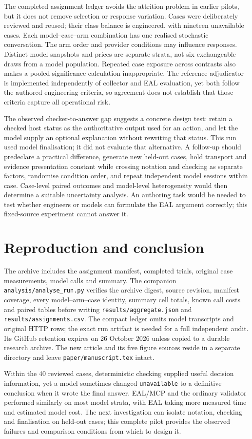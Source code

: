 \documentclass[11pt,a4paper]{article}
\newcommand{\code}[1]{\texttt{#1}}
\begin{document}
The completed assignment ledger avoids the attrition problem in earlier pilots, but it does not remove selection or response variation. Cases were deliberately reviewed and reused; their class balance is engineered, with nineteen unavailable cases. Each model--case--arm combination has one realised stochastic conversation. The arm order and provider conditions may influence responses. Distinct model snapshots and prices are separate strata, not six exchangeable draws from a model population. Repeated case exposure across contrasts also makes a pooled significance calculation inappropriate. The reference adjudicator is implemented independently of collector and EAL evaluation, yet both follow the authored engineering criteria, so agreement does not establish that those criteria capture all operational risk.

The observed checker-to-answer gap suggests a concrete design test: retain a checked host status as the authoritative output used for an action, and let the model supply an optional explanation without rewriting that status. This run used model finalisation; it did not evaluate that alternative. A follow-up should predeclare a practical difference, generate new held-out cases, hold transport and evidence presentation constant while crossing notation and checking as separate factors, randomise condition order, and repeat independent model sessions within case. Case-level paired outcomes and model-level heterogeneity would then determine a suitable uncertainty analysis. An authoring task would be needed to test whether engineers or models can formulate the EAL argument correctly; this fixed-source experiment cannot answer it.

\section{Reproduction and conclusion}
The archive includes the assignment manifest, completed trials, original case measurements, model calls and summary. The companion \code{analysis/analyse\_run.py} verifies the archive digest, source revision, manifest coverage, every model--arm--case identity, summary cell totals, known call costs and paired tables before writing \code{results/aggregate.json} and \code{results/assignments.csv}. The compact ledger omits model transcripts and original HTTP rows; the exact run artifact is needed for a full independent audit. Its GitHub retention expires on 26 October 2026 unless copied to a durable research archive. The new article and its five figure sources reside in a separate directory and leave \code{paper/manuscript.tex} intact.

Within the 40 reviewed cases, deterministic checking supplied useful decision information, yet a model sometimes changed \code{unavailable} to a definitive conclusion when it wrote the final answer. EAL/MCP and the ordinary validator performed similarly on most model strata, with EAL taking more measured time and estimated model cost. The next investigation can isolate notation, checking and finalisation on held-out cases; this complete pilot provides the observed failures and comparison conditions from which to design it.



\end{document}
